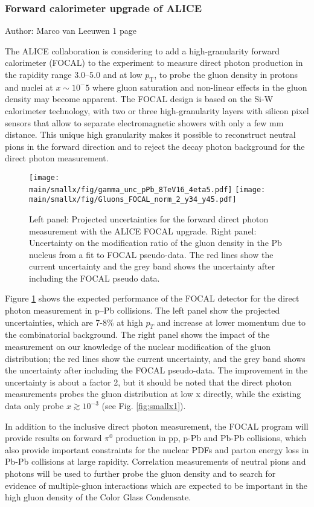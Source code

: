 \documentclass[../report.tex]{subfiles}
\providecommand{\main}{..}
\begin{document}
\subsubsection{Forward calorimeter upgrade of ALICE}
Author: Marco van Leeuwen
1 page

The ALICE collaboration is considering to add a high-granularity forward calorimeter (FOCAL) to the experiment to  measure direct photon production in the rapidity range 3.0--5.0 and at low $p_\mathrm{T}$, to probe the gluon density in protons and nuclei at $x\sim 10^-5$ where gluon saturation and non-linear effects in the gluon density may become apparent. The FOCAL design is based on the Si-W calorimeter technology, with two or three high-granularity layers with silicon pixel sensors that allow to separate electromagnetic showers with only a few mm distance. This unique high granularity makes it possible to reconstruct neutral pions in the forward direction and to reject the decay photon background for the direct photon measurement.

\begin{figure}
\texttt{[image: \\main/smallx/fig/gamma\_unc\_pPb\_8TeV16\_4eta5.pdf]}
\texttt{[image: \\main/smallx/fig/Gluons\_FOCAL\_norm\_2\_y34\_y45.pdf]}
\caption{\label{fig:focal}Left panel: Projected uncertainties for the forward direct photon measurement with the ALICE FOCAL upgrade. Right panel: Uncertainty on the modification ratio of the gluon density in the Pb nucleus from a fit to FOCAL pseudo-data. The red lines show the current uncertainty and the grey band shows the uncertainty after including the FOCAL pseudo data.}
\end{figure}

Figure \ref{fig:focal} shows the expected performance of the FOCAL detector for the direct photon measurement in p--Pb collisions. The left panel show the projected uncertainties, which are 7-8\% at high $p_{T}$ and increase at lower momentum due to the combinatorial background. The right panel shows the impact of the measurement on our knowledge of the nuclear modification of the gluon distribution; the red lines show the current uncertainty, and the grey band shows the uncertainty after including the FOCAL pseudo-data. The improvement in the uncertainty is about a factor 2, but it should be noted that the direct photon measurements probes the gluon distribution at low x directly, while the existing data only probe $x \gtrsim 10^{-3}$ (see Fig. \ref{fig:smallx1}).

In addition to the inclusive direct photon measurement, the FOCAL program will provide results on forward $\pi^{0}$ production in pp, p-Pb and Pb-Pb collisions, which also provide important constraints for the nuclear PDFs and parton energy loss in Pb-Pb collisions at large rapidity. Correlation measurements of neutral pions and photons will be used to further probe the gluon density and to search for evidence of multiple-gluon interactions which are expected to be important in the high gluon density of the Color Glass Condensate.
\end{document}
